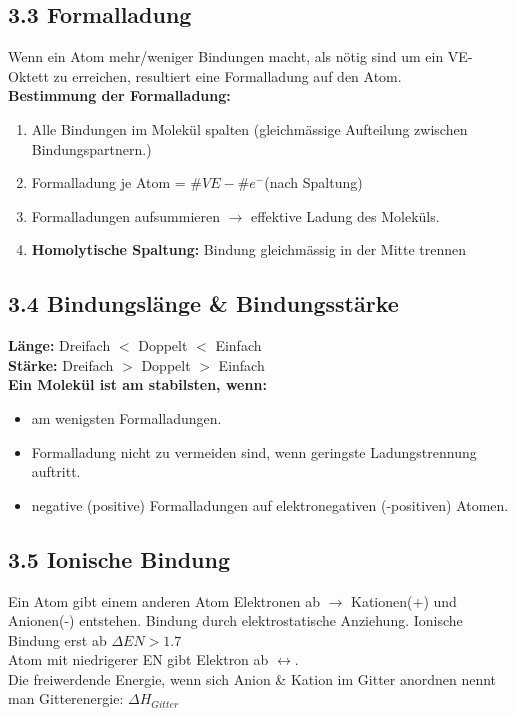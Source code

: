 \begin{multicols*}{4}
{\begin{itemize}[noitemsep, leftmargin=*]
    \end{itemize}
}

\subsection{3.3 Formalladung}{
    Wenn ein Atom mehr/weniger Bindungen macht, als nötig sind um ein VE-Oktett zu erreichen, resultiert eine Formalladung auf den Atom.\\
    \textbf{Bestimmung der Formalladung:}
    \begin{enumerate}[noitemsep,leftmargin=*]
        \item Alle Bindungen im Molekül spalten (gleichmässige Aufteilung zwischen Bindungspartnern.)
        \item Formalladung je Atom = $\# VE- \# e^-$(nach Spaltung)
        \item Formalladungen aufsummieren $\rightarrow$ effektive Ladung des Moleküls.
        \item \textbf{Homolytische Spaltung:} Bindung gleichmässig in der Mitte trennen\\
        \vspace{1mm}

    \end{enumerate}
}


\subsection{3.4 Bindungslänge \& Bindungsstärke}{
    \textbf{Länge:} Dreifach $<$ Doppelt $<$ Einfach\\
    \textbf{Stärke:} Dreifach $>$ Doppelt $>$ Einfach\\
    \textbf{Ein Molekül ist am stabilsten, wenn:}
    \begin{itemize}[noitemsep, leftmargin=*]
    \item am wenigsten Formalladungen.\item Formalladung nicht zu vermeiden sind, wenn geringste Ladungstrennung auftritt.\item negative (positive) Formalladungen auf elektronegativen (-positiven) Atomen.
    \end{itemize}
}


\subsection{3.5 Ionische Bindung}{
    Ein Atom gibt einem anderen Atom Elektronen ab $\rightarrow$ Kationen(+) und Anionen(-) entstehen. Bindung durch elektrostatische Anziehung. Ionische Bindung erst ab $\Delta EN > 1.7$\\
    Atom mit niedrigerer EN gibt Elektron ab $\leftrightarrow $.\\
    Die freiwerdende Energie, wenn sich Anion \& Kation im Gitter anordnen nennt man Gitterenergie: $\Delta H_{Gitter}$
}



\end{multicols*}
